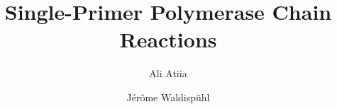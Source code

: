 
\title {\large Single-Primer Polymerase Chain Reactions }
\usepackage{authblk}
\author[1]{Ali Atiia}
\author[1]{Jérôme Waldispühl}
\renewcommand\Authfont{\fontsize{9}{14}\selectfont}
\setcounter{Maxaffil}{0}
\renewcommand\Affilfont{\fontsize{7}{14}\selectfont} %
\date{}
\usepackage[table]{xcolor} %
\usepackage{array}
\usepackage{lmodern}
\usepackage{multirow, booktabs} %
\usepackage{lmodern}
\usepackage{multirow, booktabs} %

